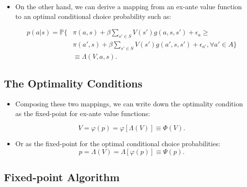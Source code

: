 \documentclass[]{book}
\providecommand{\tightlist}{%
  \setlength{\itemsep}{0pt}\setlength{\parskip}{0pt}}
\begin{document}
\begin{itemize}
\tightlist
\item
  On the other hand, we can derive a mapping from an ex-ante value
  function to an optimal conditional choice probability such as:

  \begin{equation}
  \begin{split}
  p(a|s) = \mathbb{P}\Bigg\{&\pi(a , s) + \beta \sum_{s' \in S} V(s') g(a, s, s') + \epsilon_a \ge\\
  &\pi(a' , s) + \beta \sum_{s' \in S} V(s') g(a', s, s') + \epsilon_{a'}, \forall a' \in A \Bigg\}\\
  &\equiv \Lambda(V, a, s).
  \end{split}
  \end{equation}
\end{itemize}

\subsection{The Optimality Conditions}\label{the-optimality-conditions}

\begin{itemize}
\tightlist
\item
  Composing these two mappings, we can write down the optimality
  condition as the fixed-point for ex-ante value functions:

  \begin{equation}
  V = \varphi(p) = \varphi[\Lambda(V)] \equiv \Phi(V).
  \end{equation}
\item
  Or as the fixed-point for the optimal conditional choice
  probabilities: \[
  p = \Lambda(V) = \Lambda[\varphi(p)] \equiv \Psi(p).
  \]
\end{itemize}

\subsection{Fixed-point Algorithm}\label{fixed-point-algorithm}
\end{document}
